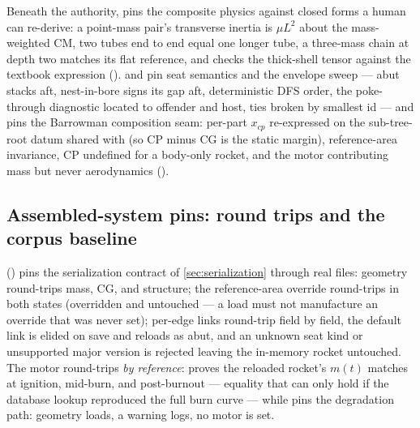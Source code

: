 Beneath the authority,  pins the composite physics against closed
forms a human can re-derive: a point-mass pair's transverse inertia is $\mu L^2$ about the
mass-weighted CM, two tubes end to end equal one longer tube, a three-mass chain at depth two
matches its flat reference, and  checks the thick-shell tensor against the
textbook expression ().  and
 pin seat semantics and the envelope sweep --- abut stacks aft, nest-in-bore
signs its gap aft, deterministic DFS order, the poke-through diagnostic located to offender and
host, ties broken by smallest id --- and  pins the Barrowman composition seam:
per-part $x_{cp}$ re-expressed on the sub-tree-root datum shared with  (so CP
minus CG is the static margin), reference-area invariance, CP undefined for a body-only rocket,
and the motor contributing mass but never aerodynamics
().

\subsection{Assembled-system pins: round trips and the corpus baseline}\label{sec:verification-integration}

 () pins the serialization contract
of \cref{sec:serialization} through real files: geometry round-trips mass, CG, and structure; the
reference-area override round-trips in both states (overridden and untouched --- a load must not
manufacture an override that was never set); per-edge links round-trip field by field, the default
link is elided on save and reloads as abut, and an unknown seat kind or unsupported major version
is rejected leaving the in-memory rocket untouched. The motor round-trips \emph{by reference}:
 proves the reloaded rocket's $m(t)$ matches at
ignition, mid-burn, and post-burnout --- equality that can only hold if the database lookup
reproduced the full burn curve --- while 
pins the degradation path: geometry loads, a warning logs, no motor is set.

